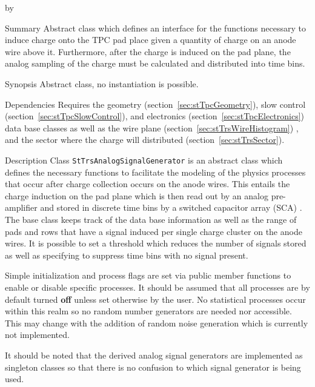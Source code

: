 \documentclass[twoside]{article}
\newcommand{\comp}[1]{\texttt{#1}}%
\newcommand{\entrylabel}[1]{\mbox{\textbf{{#1}}}\hfil}%
\newenvironment{entry}
{\begin{list}{}%
    {\renewcommand{\makelabel}{\entrylabel}%
     \setlength{\labelwidth}{90pt}%
     \setlength{\leftmargin}{\labelwidth}
     \advance\leftmargin by \labelsep%
      }%
    }%
  {\end{list}}
\newcommand{\Entrylabel}[1]%
{\raisebox{0pt}[1ex][0pt]{\makebox[\labelwidth][l]%
    {\parbox[t]{\labelwidth}{\hspace{0pt}\textbf{{#1}}}}}}
\newenvironment{Entry}%
{\renewcommand{\entrylabel}{\Entrylabel}\begin{entry}}%
  {\end{entry}}
\begin{document}
\begin{Entry}
\item[Summary]
  Abstract class which defines an interface for the functions necessary 
  to induce charge onto the TPC pad place given a quantity of charge
  on an anode wire above it.  Furthermore, after the charge is induced on
  the pad plane, the analog sampling of the charge must be calculated
  and distributed into time bins. 

\item[Synopsis]
   Abstract class, no instantiation is possible.

\item[Dependencies]
   Requires the geometry (section~\ref{sec:stTpcGeometry}),
   slow control (section~\ref{sec:stTpcSlowControl}), and
   electronics (section~\ref{sec:stTpcElectronics}) data base
   classes as well as the wire plane (section~\ref{sec:stTrsWireHistogram})
   , and the sector where the charge will
   distributed (section~\ref{sec:stTrsSector}).

\item[Description]
Class \comp{StTrsAnalogSignalGenerator} is an abstract class which defines
the necessary functions to facilitate the modeling of the physics
processes that occur after charge collection occurs on the anode wires.
This entails the charge induction on the pad plane which is then read
out by an analog pre-amplifier and stored in discrete time bins by
a switched capacitor array (SCA) .
The base class keeps track of the data base information
as well as the range of pads and
rows that have a signal induced per single charge cluster on the anode
wires.  It is possible to set a threshold which reduces the number of
signals stored as well as specifying to suppress time bins with no
signal present.

Simple initialization and process flags are set via public member
functions to enable or disable specific processes.  It should be
assumed that all processes are by default turned {\bf off} unless
set otherwise by the user.  No statistical processes occur
within this realm so no random number generators are needed nor accessible.
This may change with the addition of random noise generation which is
currently not implemented.

It should be noted that the derived analog signal generators are implemented
as singleton classes so that there is no confusion to which signal
generator is being used. 


\end{Entry}
\end{document}
